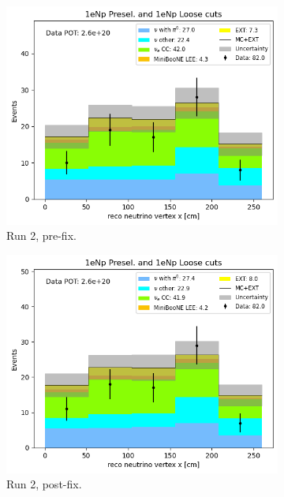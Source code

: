 \begin{figure}[H]
    \begin{subfigure}{0.5\linewidth}
        \includegraphics[width=\linewidth]{technote/SystematicsSensitivity/Figures/Run2_Vertex_X_Alex.png}
        \caption{Run 2, pre-fix.}
    \end{subfigure}%
    \begin{subfigure}{0.5\linewidth}
        \includegraphics[width=\linewidth]{technote/SystematicsSensitivity/Figures/Run2_Vertex_X_Alex_BugFix.png}
        \caption{Run 2, post-fix.}
    \end{subfigure}
    \begin{subfigure}{0.5\linewidth}

\end{subfigure}
\end{figure}
